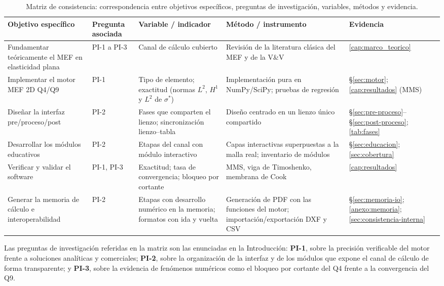 \begin{table}[htbp]
\centering
\caption[Matriz de consistencia de la investigación.]{Matriz de consistencia: correspondencia entre objetivos específicos, preguntas de investigación, variables, métodos y evidencia.}
\label{tab:consistencia}
{\footnotesize
\setlength{\tabcolsep}{4pt}
\renewcommand{\arraystretch}{1.2}
\begin{tabular}{@{}p{3.0cm}p{2.3cm}p{2.7cm}p{2.7cm}p{2.4cm}@{}}
\toprule
\textbf{Objetivo específico} & \textbf{Pregunta asociada} & \textbf{Variable / indicador} & \textbf{Método / instrumento} & \textbf{Evidencia} \\
\midrule
Fundamentar teóricamente el MEF en elasticidad plana & PI-1 a PI-3 & Canal de cálculo cubierto & Revisión de la literatura clásica del MEF y de la V\&V & \autoref{cap:marco_teorico} \\
Implementar el motor MEF 2D Q4/Q9 & PI-1 & Tipo de elemento; exactitud (normas $L^2$, $H^1$ y $L^2$ de $\sigma^*$) & Implementación pura en NumPy/SciPy; pruebas de regresión & \S\ref{sec:motor}; \autoref{cap:resultados} (MMS) \\
Diseñar la interfaz pre/proceso/post & PI-2 & Fases que comparten el lienzo; sincronización lienzo--tabla & Diseño centrado en un lienzo único compartido & \S\ref{sec:pre-proceso}--\S\ref{sec:post-proceso}; \autoref{tab:fases} \\
Desarrollar los módulos educativos & PI-2 & Etapas del canal con módulo interactivo & Capas interactivas superpuestas a la malla real; inventario de módulos & \S\ref{sec:educacion}; \autoref{sec:cobertura} \\
Verificar y validar el software & PI-1, PI-3 & Exactitud; tasa de convergencia; bloqueo por cortante & MMS, viga de Timoshenko, membrana de Cook & \autoref{cap:resultados} \\
Generar la memoria de cálculo e interoperabilidad & PI-2 & Etapas con desarrollo numérico en la memoria; formatos con ida y vuelta & Generación de PDF con las funciones del motor; importación/exportación DXF y CSV & \S\ref{sec:memoria-io}; \autoref{anexo:memoria}; \autoref{sec:consistencia-interna} \\
\bottomrule
\end{tabular}}
\renewcommand{\arraystretch}{1.0}
\end{table}

Las preguntas de investigación referidas en la matriz son las enunciadas en la Introducción: \textbf{PI-1}, sobre la precisión verificable del motor frente a soluciones analíticas y comerciales; \textbf{PI-2}, sobre la organización de la interfaz y de los módulos que expone el canal de cálculo de forma transparente; y \textbf{PI-3}, sobre la evidencia de fenómenos numéricos como el bloqueo por cortante del Q4 frente a la convergencia del Q9.

